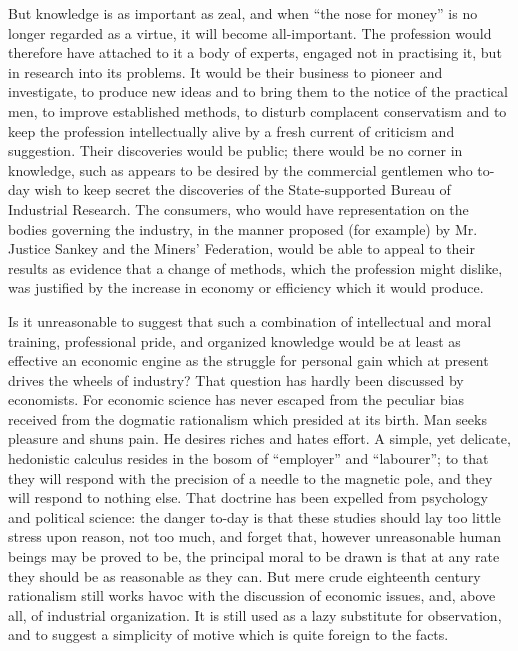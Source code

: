 \documentclass{book}
\begin{document}
But knowledge is as important as zeal, and when “the nose for money” is no longer regarded as a virtue, it will become all-important. The profession would therefore have attached to it a body of experts, engaged not in practising it, but in research into its problems. It would be their business to pioneer and investigate, to produce new ideas and to bring them to the notice of the practical men, to improve established methods, to disturb complacent conservatism and to keep the profession intellectually alive by a fresh current of criticism and suggestion. Their discoveries would be public; there would be no corner in knowledge, such as appears to be desired by the commercial gentlemen who to-day wish to keep secret the discoveries of the State-supported Bureau of Industrial Research. The consumers, who would have representation on the bodies governing the industry, in the manner proposed (for example) by Mr. Justice Sankey and the Miners’ Federation, would be able to appeal to their results as evidence that a change of methods, which the profession might dislike, was justified by the increase in economy or efficiency which it would produce.

Is it unreasonable to suggest that such a combination of intellectual and moral training, professional pride, and organized knowledge would be at least as effective an economic engine as the struggle for personal gain which at present drives the wheels of industry? That question has hardly been discussed by economists. For economic science has never escaped from the peculiar bias received from the dogmatic rationalism which presided at its birth. Man seeks pleasure and shuns pain. He desires riches and hates effort. A simple, yet delicate, hedonistic calculus resides in the bosom of “employer” and “labourer”; to that they will respond with the precision of a needle to the magnetic pole, and they will respond to nothing else. That doctrine has been expelled from psychology and political science: the danger to-day is that these studies should lay too little stress upon reason, not too much, and forget that, however unreasonable human beings may be proved to be, the principal moral to be drawn is that at any rate they should be as reasonable as they can. But mere crude eighteenth century rationalism still works havoc with the discussion of economic issues, and, above all, of industrial organization. It is still used as a lazy substitute for observation, and to suggest a simplicity of motive which is quite foreign to the facts.
\end{document}
